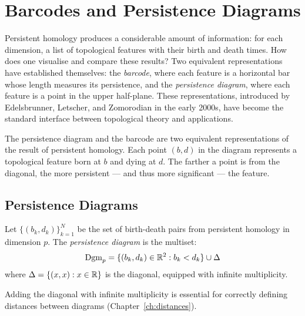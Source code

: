 \chapter{Barcodes and Persistence Diagrams}
\label{ch:diagrams}

Persistent homology produces a considerable amount of information: for each dimension, a list of topological features with their birth and death times. How does one visualise and compare these results? Two equivalent representations have established themselves: the \emph{barcode}, where each feature is a horizontal bar whose length measures its persistence, and the \emph{persistence diagram}, where each feature is a point in the upper half-plane. These representations, introduced by Edelsbrunner, Letscher, and Zomorodian in the early 2000s, have become the standard interface between topological theory and applications.

\begin{intuition}
The persistence diagram and the barcode are two equivalent
representations of the result of persistent homology. Each point
$(b, d)$ in the diagram represents a topological feature born at $b$
and dying at $d$. The farther a point is from the diagonal, the more
persistent --- and thus more significant --- the feature.
\end{intuition}

\section{Persistence Diagrams}

\begin{definition}
Let $\{(b_k, d_k)\}_{k=1}^N$ be the set of birth-death pairs from
persistent homology in dimension $p$. The \emph{persistence diagram}
is the multiset:
\[
  \mathrm{Dgm}_p = \{(b_k, d_k) \in \mathbb{R}^2 : b_k < d_k\}
  \cup \Delta
\]
where $\Delta = \{(x, x) : x \in \mathbb{R}\}$ is the diagonal, equipped
with infinite multiplicity.
\end{definition}

\begin{remark}
Adding the diagonal with infinite multiplicity is essential for
correctly defining distances between diagrams
(Chapter~\ref{ch:distances}).
\end{remark}

